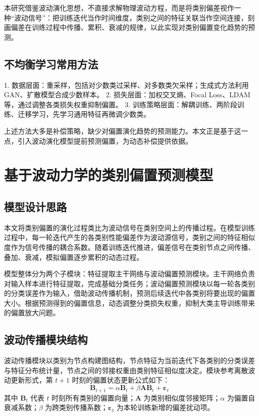 \documentclass{article}
\begin{document}
本研究借鉴波动演化思想，不直接求解物理波动方程，而是将类别偏差视作一种“波动信号”：把训练迭代当作时间维度，类别之间的特征关联当作空间连接，刻画偏差在训练过程中传播、累积、衰减的规律，以此实现对类别偏置变化趋势的预测。

\subsection{不均衡学习常用方法}
1. 数据层面：重采样，包括对少数类过采样、对多数类欠采样；生成式方法利用GAN、扩散模型合成少数样本。
2. 损失层面：加权交叉熵、Focal Loss、LDAM等，通过调整各类损失权重抑制偏置。
3. 训练策略层面：解耦训练、两阶段训练、迁移学习，先学习通用特征再微调少数类。

上述方法大多是补偿策略，缺少对偏置演化趋势的预测能力。本文正是基于这一点，引入波动演化模型提前预测偏置，为动态补偿提供依据。

\section{基于波动力学的类别偏置预测模型}
\subsection{模型设计思路}
本文将类别偏置的演化过程类比为波动信号在类别空间上的传播过程。在模型训练过程中，每一轮迭代产生的各类别性能偏差作为波动源信号，类别之间的特征相似度作为信号传播的耦合系数。随着训练迭代推进，偏差信号在类别节点之间传播、叠加、衰减，模拟偏置逐步累积的动态过程。

模型整体分为两个子模块：特征提取主干网络与波动偏置预测模块。主干网络负责对输入样本进行特征提取，完成基础分类任务；波动偏置预测模块以每一轮各类别的分类误差作为输入，借助波动传播机制，预测后续迭代中各类别将要出现的偏置大小。根据预测得到的偏置信息，动态调整分类损失权重，抑制大类主导训练带来的偏置放大问题。

\subsection{波动传播模块结构}
波动传播模块以类别为节点构建图结构，节点特征为当前迭代下各类别的分类误差与特征分布统计量，节点之间的邻接权重由类别特征相似度决定。模块参考离散波动更新形式，第 $t+1$ 时刻的偏置状态更新公式如下：
\[
\boldsymbol{B}_{t+1}=\alpha \boldsymbol{B}_t+\beta \boldsymbol{A}\boldsymbol{B}_t+\boldsymbol{\varepsilon}_t
\]
其中 $\boldsymbol{B}_t$ 代表 $t$ 时刻所有类别的偏置向量；$\boldsymbol{A}$ 为类别相似度邻接矩阵；$\alpha$ 为偏置自衰减系数；$\beta$ 为跨类别传播系数；$\boldsymbol{\varepsilon}_t$ 为本轮训练新增的偏差扰动项。
\end{document}
